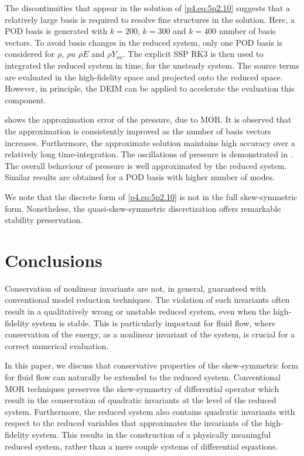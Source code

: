 The discontinuities that appear in the solution of \eqref{p4.eq:5p2.10} suggests that a relatively large basis is required to resolve fine structures in the solution. Here, a POD basis is generated with $k=200$, $k=300$ and $k=400$ number of basis vectors. To avoid basis changes in the reduced system, only one POD basis is considered for $\rho$, $\rho u$ $\rho E$ and $\rho Y_{ox}$. The explicit SSP RK3 is then used to integrated the reduced system in time, for the unsteady system. The source terms are evaluated in the high-fidelity space and projected onto the reduced space. However, in principle, the DEIM can be applied to accelerate the evaluation this component. 

 shows the approximation error of the pressure, due to MOR. It is observed that the approximation is consistently improved as the number of basis vectors increases. Furthermore, the approximate solution maintains high accuracy over a relatively long time-integration. The oscillations of pressure is demonstrated in . The overall behaviour of pressure is well approximated by the reduced system. Similar results are obtained for a POD basis with higher number of modes.

We note that the discrete form of \eqref{p4.eq:5p2.10} is not in the full skew-symmetric form. Nonetheless, the quasi-skew-symmetric discretization offers remarkable stability preservation.

\section{Conclusions} \label{p4.sec:con}

Conservation of nonlinear invariants are not, in general, guaranteed with conventional model reduction techniques. The violation of such invariants often result in a qualitatively wrong or unstable reduced system, even when the high-fidelity system is stable. This is particularly important for fluid flow, where conservation of the energy, as a nonlinear invariant of the system, is crucial for a correct numerical evaluation.

In this paper, we discuss that conservative properties of the skew-symmetric form for fluid flow can naturally be extended to the reduced system. Conventional MOR techniques preserves the skew-symmetry of differential operator which result in the conservation of quadratic invariants at the level of the reduced system. Furthermore, the reduced system also contains quadratic invariants with respect to the reduced variables that approximates the invariants of the high-fidelity system. This results in the construction of a physically meaningful reduced system, rather than a mere couple systems of differential equations.

